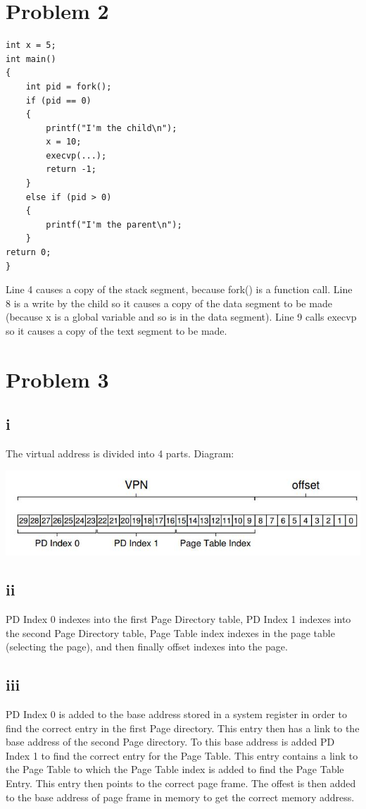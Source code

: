 \documentclass[11pt]{article} %
\begin{document}
\section*{Problem 2}
\begin{lstlisting}
int x = 5;
int main()
{
	int pid = fork();
	if (pid == 0)
	{
		printf("I'm the child\n");
		x = 10;
		execvp(...);
		return -1;
	}
	else if (pid > 0)
	{
		printf("I'm the parent\n");
	}
return 0;
}
\end{lstlisting}

Line 4 causes a copy of the stack segment, because fork() is a function call. Line 8 is a write by the child so it causes a copy of the data segment to be made (because x is a global variable and so is in the data segment). Line 9 calls execvp so it causes a copy of the text segment to be made.

\section*{Problem 3}

\subsection*{i}
The virtual address is divided into 4 parts. Diagram:

 \includegraphics{untitled1.JPG}
\subsection*{ii}

PD Index 0 indexes into the first Page Directory table, PD Index 1 indexes into the second Page Directory table, Page Table index indexes in the page table (selecting the page), and then finally offset indexes into the page.

\subsection*{iii}

PD Index 0 is added to the base address stored in a system register in order to find the correct entry in the first Page directory. This entry then has a link to the base address of the second Page directory. To this base address is added PD Index 1 to find the correct entry for the Page Table. This entry contains a link to the Page Table to which the Page Table index is added to find the Page Table Entry. This entry then points to the correct page frame. The offest is then added to the base address of page frame in memory to get the correct memory address.
\end{document}
